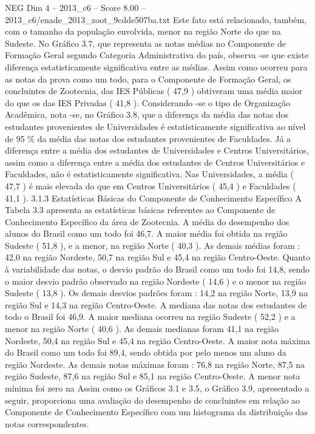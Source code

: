 \begin{textsample}{NEG Dim 4 – 2013\_c6 – Score 8.00 – 2013\_c6/enade\_2013\_zoot\_9cdde507ba.txt}
Este fato está relacionado, também, com o tamanho da população envolvida, menor na região Norte do que na Sudeste.
No Gráfico 3.7, que representa as notas médias no Componente de Formação Geral segundo Categoria Administrativa do país, observa -se que existe diferença estatisticamente significativa entre as médias.
Assim como ocorreu para as notas da prova como um todo, para o Componente de Formação Geral, os concluintes de Zootecnia, das IES Públicas ( 47,9 ) obtiveram uma média maior do que os das IES Privadas ( 41,8 ).
Considerando -se o tipo de Organização Acadêmica, nota -se, no Gráfico 3.8, que a diferença da média das notas dos estudantes provenientes de Universidades é estatisticamente significativa ao nível de 95 \% da média das notas dos estudantes provenientes de Faculdades.
Já a diferença entre a média dos estudantes de Universidades e Centros Universitários, assim como a diferença entre a média dos estudantes de Centros Universitários e Faculdades, não é estatisticamente significativa.
Nas Universidades, a média ( 47,7 ) é mais elevada do que em Centros Universitários ( 45,4 ) e Faculdades ( 41,1 ). 3.1.3 Estatísticas Básicas do Componente de Conhecimento Específico A Tabela 3.3 apresenta as estatísticas básicas referentes ao Componente de Conhecimento Específico da área de Zootecnia.
A média do desempenho dos alunos do Brasil como um todo foi 46,7.
A maior média foi obtida na região Sudeste ( 51,8 ), e a menor, na região Norte ( 40,3 ).
As demais médias foram : 42,0 na região Nordeste, 50,7 na região Sul e 45,4 na região Centro-Oeste.
Quanto à variabilidade das notas, o desvio padrão do Brasil como um todo foi 14,8, sendo o maior desvio padrão observado na região Nordeste ( 14,6 ) e o menor na região Sudeste ( 13,8 ).
Os demais desvios padrões foram : 14,2 na região Norte, 13,9 na região Sul e 14,3 na região Centro-Oeste.
A mediana das notas dos estudantes de todo o Brasil foi 46,9.
A maior mediana ocorreu na região Sudeste ( 52,2 ) e a menor na região Norte ( 40,6 ).
As demais medianas foram 41,1 na região Nordeste, 50,4 na região Sul e 45,4 na região Centro-Oeste.
A maior nota máxima do Brasil como um todo foi 89,4, sendo obtida por pelo menos um aluno da região Nordeste.
As demais notas máximas foram : 76,8 na região Norte, 87,5 na região Sudeste, 87,6 na região Sul e 85,1 na região Centro-Oeste.
A menor nota mínima foi zero na Assim como os Gráficos 3.1 e 3.5, o Gráfico 3.9, apresentado a seguir, proporciona uma avaliação do desempenho de concluintes em relação ao Componente de Conhecimento Específico com um histograma da distribuição das notas correspondentes.

\end{textsample}
